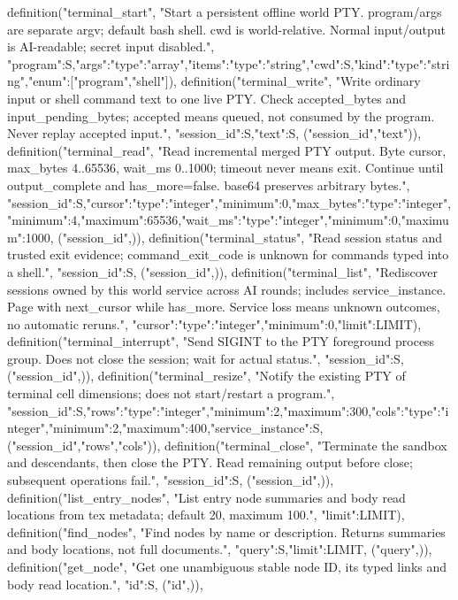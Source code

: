     definition("terminal_start", "Start a persistent offline world PTY. program/args are separate argv; default bash shell. cwd is world-relative. Normal input/output is AI-readable; secret input disabled.", {"program":S,"args":{"type":"array","items":{"type":"string"}},"cwd":S,"kind":{"type":"string","enum":["program","shell"]}}),
    definition("terminal_write", "Write ordinary input or shell command text to one live PTY. Check accepted_bytes and input_pending_bytes; accepted means queued, not consumed by the program. Never replay accepted input.", {"session_id":S,"text":S}, ("session_id","text")),
    definition("terminal_read", "Read incremental merged PTY output. Byte cursor, max_bytes 4..65536, wait_ms 0..1000; timeout never means exit. Continue until output_complete and has_more=false. base64 preserves arbitrary bytes.", {"session_id":S,"cursor":{"type":"integer","minimum":0},"max_bytes":{"type":"integer","minimum":4,"maximum":65536},"wait_ms":{"type":"integer","minimum":0,"maximum":1000}}, ("session_id",)),
    definition("terminal_status", "Read session status and trusted exit evidence; command_exit_code is unknown for commands typed into a shell.", {"session_id":S}, ("session_id",)),
    definition("terminal_list", "Rediscover sessions owned by this world service across AI rounds; includes service_instance. Page with next_cursor while has_more. Service loss means unknown outcomes, no automatic reruns.", {"cursor":{"type":"integer","minimum":0},"limit":LIMIT}),
    definition("terminal_interrupt", "Send SIGINT to the PTY foreground process group. Does not close the session; wait for actual status.", {"session_id":S}, ("session_id",)),
    definition("terminal_resize", "Notify the existing PTY of terminal cell dimensions; does not start/restart a program.", {"session_id":S,"rows":{"type":"integer","minimum":2,"maximum":300},"cols":{"type":"integer","minimum":2,"maximum":400},"service_instance":S}, ("session_id","rows","cols")),
    definition("terminal_close", "Terminate the sandbox and descendants, then close the PTY. Read remaining output before close; subsequent operations fail.", {"session_id":S}, ("session_id",)),
    definition("list_entry_nodes", "List entry node summaries and body read locations from tex metadata; default 20, maximum 100.", {"limit":LIMIT}),
    definition("find_nodes", "Find nodes by name or description. Returns summaries and body locations, not full documents.", {"query":S,"limit":LIMIT}, ("query",)),
    definition("get_node", "Get one unambiguous stable node ID, its typed links and body read location.", {"id":S}, ("id",)),
